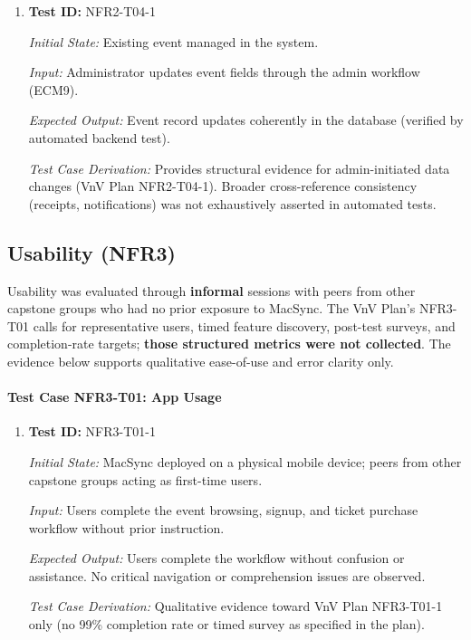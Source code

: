 \documentclass[12pt, titlepage]{article}
\begin{document}
\begin{enumerate}

\item \textbf{Test ID:} NFR2-T04-1

\textit{Initial State:} Existing event managed in the system.

\textit{Input:} Administrator updates event fields through the admin workflow (ECM9).

\textit{Expected Output:} Event record updates coherently in the database (verified by automated backend test).

\textit{Test Case Derivation:} Provides structural evidence for admin-initiated data changes (VnV Plan NFR2-T04-1). Broader cross-reference consistency (receipts, notifications) was not exhaustively asserted in automated tests.

\end{enumerate}


\subsection{Usability (NFR3)}

Usability was evaluated through \textbf{informal} sessions with peers from other capstone groups who had no prior exposure to MacSync. The VnV Plan's NFR3-T01 calls for representative users, timed feature discovery, post-test surveys, and completion-rate targets; \textbf{those structured metrics were not collected}. The evidence below supports qualitative ease-of-use and error clarity only.

\paragraph{Test Case NFR3-T01: App Usage}

\begin{enumerate}

\item \textbf{Test ID:} NFR3-T01-1

\textit{Initial State:} MacSync deployed on a physical mobile device; peers from other capstone groups acting as first-time users.

\textit{Input:} Users complete the event browsing, signup, and ticket purchase workflow without prior instruction.

\textit{Expected Output:} Users complete the workflow without confusion or assistance. No critical navigation or comprehension issues are observed.

\textit{Test Case Derivation:} Qualitative evidence toward VnV Plan NFR3-T01-1 only (no 99\% completion rate or timed survey as specified in the plan).

\end{enumerate}
\end{document}
